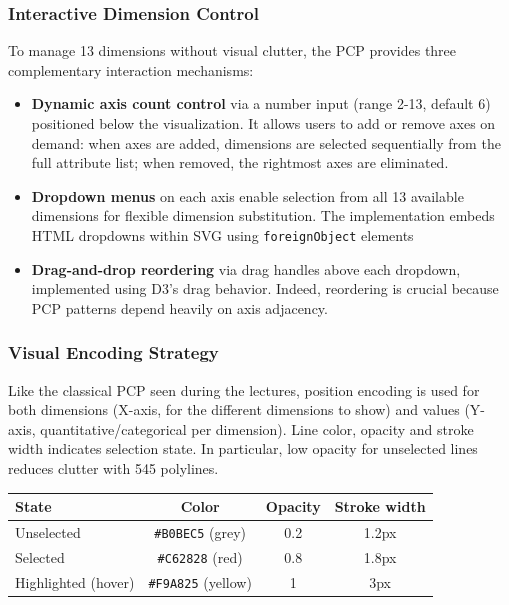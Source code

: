 \documentclass[10pt,a4paper]{article}
\begin{document}
\vspace{-2pt}
\subsubsection{Interactive Dimension Control}

To manage 13 dimensions without visual clutter, the PCP provides three complementary interaction mechanisms:

\begin{itemize}
    \item \textbf{Dynamic axis count control} via a number input (range 2-13, default 6) positioned below the visualization. It allows users to add or remove axes on demand: when axes are added, dimensions are selected sequentially from the full attribute list; when removed, the rightmost axes are eliminated.
    \item \textbf{Dropdown menus} on each axis enable selection from all 13 available dimensions for flexible dimension substitution. The implementation embeds HTML dropdowns within SVG using \texttt{foreignObject} elements
    \item \textbf{Drag-and-drop reordering} via drag handles above each dropdown, implemented using D3's drag behavior. Indeed, reordering is crucial because PCP patterns depend heavily on axis adjacency.
\end{itemize}

\vspace{-3pt}
\subsubsection{Visual Encoding Strategy}

Like the classical PCP seen during the lectures, position encoding is used for both dimensions (X-axis, for the different dimensions to show) and values (Y-axis, quantitative/categorical per dimension). Line color, opacity and stroke width indicates selection state. In particular, low opacity for unselected lines reduces clutter with 545 polylines. 

\begin{table}[h]
    \centering
    \label{tab:line-styles}
    \begin{tabular}{l c c c}
        \hline
        State & Color & Opacity & Stroke width \\
        \hline
        Unselected & \texttt{\#B0BEC5} (grey) & 0.2 & 1.2px \\
        Selected & \texttt{\#C62828} (red) & 0.8 & 1.8px \\
        Highlighted (hover) & \texttt{\#F9A825} (yellow) & 1 & 3px \\
        \hline
    \end{tabular}
\end{table}
\end{document}
